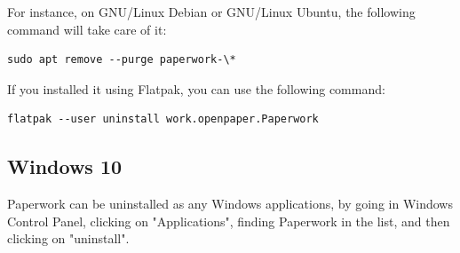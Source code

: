 \documentclass[10pt,a4paper]{article}
\begin{document}
For instance, on GNU/Linux Debian or GNU/Linux Ubuntu, the following command
will take care of it:

\begin{verbatim}
sudo apt remove --purge paperwork-\*
\end{verbatim}

If you installed it using Flatpak, you can use the following command:

\begin{verbatim}
flatpak --user uninstall work.openpaper.Paperwork
\end{verbatim}

\subsection{Windows 10}

Paperwork can be uninstalled as any Windows applications, by going in
Windows Control Panel, clicking on "Applications", finding Paperwork in the
list, and then clicking on "uninstall".
\end{document}
